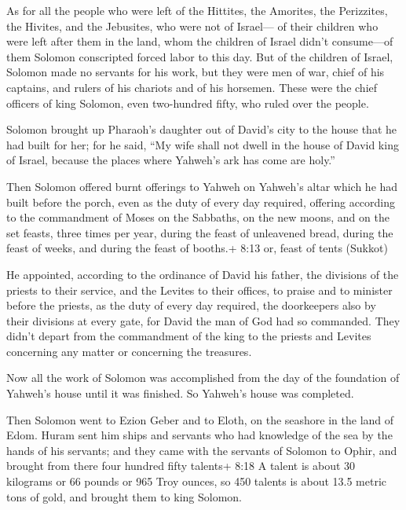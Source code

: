  As for all the people who were left of the Hittites, the
Amorites, the Perizzites, the Hivites, and the Jebusites, who were not
of Israel---  of their children who were left after them in
the land, whom the children of Israel didn't consume---of them Solomon
conscripted forced labor to this day.  But of the children
of Israel, Solomon made no servants for his work, but they were men of
war, chief of his captains, and rulers of his chariots and of his
horsemen.  These were the chief officers of king Solomon,
even two-hundred fifty, who ruled over the people.

 Solomon brought up Pharaoh's daughter out of David's city
to the house that he had built for her; for he said, ``My wife shall not
dwell in the house of David king of Israel, because the places where
Yahweh's ark has come are holy.''

 Then Solomon offered burnt offerings to Yahweh on Yahweh's
altar which he had built before the porch,  even as the
duty of every day required, offering according to the commandment of
Moses on the Sabbaths, on the new moons, and on the set feasts, three
times per year, during the feast of unleavened bread, during the feast
of weeks, and during the feast of booths.+ 8:13 or, feast of tents
(Sukkot)

 He appointed, according to the ordinance of David his
father, the divisions of the priests to their service, and the Levites
to their offices, to praise and to minister before the priests, as the
duty of every day required, the doorkeepers also by their divisions at
every gate, for David the man of God had so commanded. 
They didn't depart from the commandment of the king to the priests and
Levites concerning any matter or concerning the treasures.

 Now all the work of Solomon was accomplished from the day
of the foundation of Yahweh's house until it was finished. So Yahweh's
house was completed.

 Then Solomon went to Ezion Geber and to Eloth, on the
seashore in the land of Edom.  Huram sent him ships and
servants who had knowledge of the sea by the hands of his servants; and
they came with the servants of Solomon to Ophir, and brought from there
four hundred fifty talents+ 8:18 A talent is about 30 kilograms or 66
pounds or 965 Troy ounces, so 450 talents is about 13.5 metric tons of
gold, and brought them to king Solomon.

